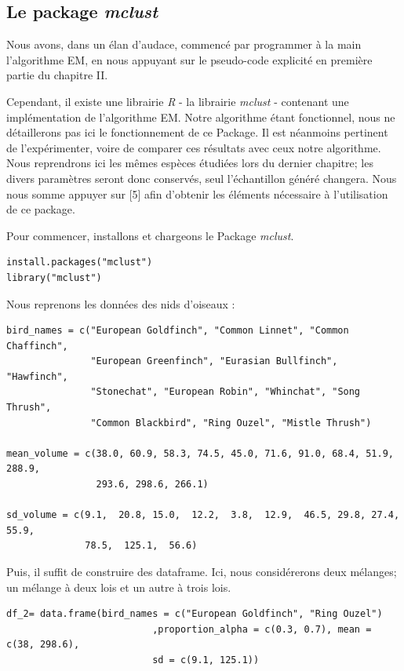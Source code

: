 \documentclass[frenchb]{report}
\newcommand{\1}{\mathbbm{1}}
\theoremstyle{definition}\newtheorem{defn}{Définition}
\theoremstyle{definition}\newtheorem{exm}{Exemple}
\theoremstyle{definition}\newtheorem{nota}{Notation}
\theoremstyle{definition}\newtheorem{rem}{Remarque}
\begin{document}
\begin{appendices}
\chapter{Le package \textit{mclust}}
Nous avons, dans un élan d'audace, commencé par programmer à la main l'algorithme EM, en nous appuyant sur le pseudo-code explicité en première partie du chapitre II. \newline

Cependant, il existe une librairie \textit{R} - la librairie \textit{mclust} - contenant une implémentation de l'algorithme EM. Notre algorithme étant fonctionnel, nous ne détaillerons pas ici le fonctionnement de ce Package. Il est néanmoins pertinent de l'expérimenter, voire de comparer ces résultats avec ceux notre algorithme. Nous reprendrons ici les mêmes espèces étudiées lors du dernier chapitre; les divers paramètres seront donc conservés, seul l'échantillon généré changera. Nous nous somme appuyer sur [5] afin d'obtenir les éléments nécessaire à l'utilisation de ce package.

Pour commencer, installons et chargeons le Package \textit{mclust}.
\begin{lstlisting}
install.packages("mclust")
library("mclust")
\end{lstlisting}
%
Nous reprenons les données des nids d'oiseaux :
\begin{lstlisting}
bird_names = c("European Goldfinch", "Common Linnet", "Common Chaffinch",
               "European Greenfinch", "Eurasian Bullfinch", "Hawfinch",
               "Stonechat", "European Robin", "Whinchat", "Song Thrush",
               "Common Blackbird", "Ring Ouzel", "Mistle Thrush")

mean_volume = c(38.0, 60.9, 58.3, 74.5, 45.0, 71.6, 91.0, 68.4, 51.9, 288.9,
                293.6, 298.6, 266.1)

sd_volume = c(9.1,  20.8, 15.0,  12.2,  3.8,  12.9,  46.5, 29.8, 27.4, 55.9,
              78.5,  125.1,  56.6)
\end{lstlisting}
%
Puis, il suffit de construire des dataframe. Ici, nous considérerons deux mélanges; un mélange à deux lois et un autre à trois lois.
\begin{lstlisting}
df_2= data.frame(bird_names = c("European Goldfinch", "Ring Ouzel")
                          ,proportion_alpha = c(0.3, 0.7), mean = c(38, 298.6),
                          sd = c(9.1, 125.1))


\end{lstlisting}
\end{appendices}
\end{document}
